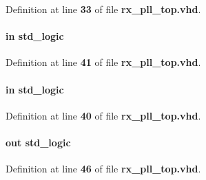 Definition at line {\bf 33} of file {\bf rx\+\_\+pll\+\_\+top.\+vhd}.

\paragraph[{pll\+\_\+areset}]{ {\bfseries \textcolor{keywordflow}{in}\textcolor{vhdlchar}{ }} {\bfseries \textcolor{comment}{std\+\_\+logic}\textcolor{vhdlchar}{ }} \hspace{0.3cm}{\ttfamily [Port]}}\label{classrx__pll__top_aa791373ad6423b972af713228ffedbd5}


Definition at line {\bf 41} of file {\bf rx\+\_\+pll\+\_\+top.\+vhd}.

\paragraph[{pll\+\_\+inclk}]{ {\bfseries \textcolor{keywordflow}{in}\textcolor{vhdlchar}{ }} {\bfseries \textcolor{comment}{std\+\_\+logic}\textcolor{vhdlchar}{ }} \hspace{0.3cm}{\ttfamily [Port]}}\label{classrx__pll__top_a9244ff8fbe4e7d37feec8f6cb490f22d}


Definition at line {\bf 40} of file {\bf rx\+\_\+pll\+\_\+top.\+vhd}.

\paragraph[{pll\+\_\+locked}]{ {\bfseries \textcolor{keywordflow}{out}\textcolor{vhdlchar}{ }} {\bfseries \textcolor{comment}{std\+\_\+logic}\textcolor{vhdlchar}{ }} \hspace{0.3cm}{\ttfamily [Port]}}\label{classrx__pll__top_a20ad7319777025c5ed65a33f46e63e11}


Definition at line {\bf 46} of file {\bf rx\+\_\+pll\+\_\+top.\+vhd}.

